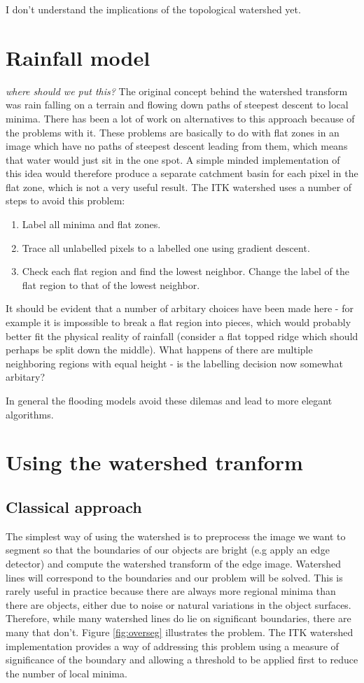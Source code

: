 \documentclass{InsightArticle}
\begin{document}
I don't understand the implications of the topological watershed yet.

\section{Rainfall model}
\label{sect:rainfall}
{\em where should we put this?}  The original concept behind the
watershed transform was rain falling on a terrain and flowing down
paths of steepest descent to local minima. There has been a lot of
work on alternatives to this approach because of the problems with
it. These problems are basically to do with flat zones in an image
which have no paths of steepest descent leading from them, which means
that water would just sit in the one spot. A simple minded
implementation of this idea would therefore produce a separate
catchment basin for each pixel in the flat zone, which is not a very
useful result. The ITK watershed uses a number of steps to avoid this problem:
\begin{enumerate}
\item Label all minima and flat zones.
\item Trace all unlabelled pixels to a labelled one using gradient descent.
\item Check each flat region and find the lowest neighbor. Change the label of the flat region to that of the lowest neighbor.
\end{enumerate}
 
It should be evident that a number of arbitary choices have been made
here - for example it is impossible to break a flat region into
pieces, which would probably better fit the physical reality of
rainfall (consider a flat topped ridge which should perhaps be split
down the middle). What happens of there are multiple neighboring
regions with equal height - is the labelling decision now somewhat arbitary?

In general the flooding models avoid these dilemas and lead to more
elegant algorithms.


\section{Using the watershed tranform}
\label{sect:usingWT}
\subsection{Classical approach}
The simplest way of using the watershed is to preprocess the image we
want to segment so that the boundaries of our objects are bright (e.g
apply an edge detector) and compute the watershed transform of the
edge image. Watershed lines will correspond to the boundaries and our
problem will be solved. This is rarely useful in practice because
there are always more regional minima than there are objects, either
due to noise or natural variations in the object surfaces. Therefore,
while many watershed lines do lie on significant boundaries, there are
many that don't. Figure \ref{fig:overseg} illustrates the problem. The ITK
watershed implementation provides a way of addressing this problem
using a measure of significance of the boundary and allowing a
threshold to be applied first to reduce the number of local minima. 
\end{document}
